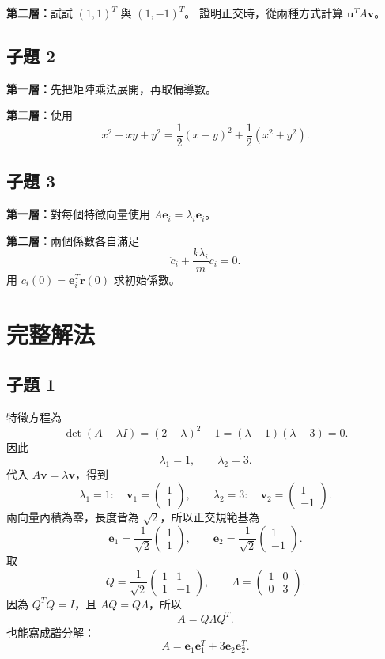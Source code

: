 \documentclass[12pt,a4paper]{article}
\begin{document}
\textbf{第二層：}試試 \((1,1)^T\) 與 \((1,-1)^T\)。
證明正交時，從兩種方式計算 \(\mathbf u^TA\mathbf v\)。

\subsection*{子題 2}
\textbf{第一層：}先把矩陣乘法展開，再取偏導數。

\textbf{第二層：}使用
\[
    x^2-xy+y^2=\frac12(x-y)^2+\frac12(x^2+y^2).
\]

\subsection*{子題 3}
\textbf{第一層：}對每個特徵向量使用 \(A\mathbf e_i=\lambda_i\mathbf e_i\)。

\textbf{第二層：}兩個係數各自滿足
\[
    \ddot c_i+\frac{k\lambda_i}{m}c_i=0.
\]
用 \(c_i(0)=\mathbf e_i^T\mathbf r(0)\) 求初始係數。

\clearpage
\section{完整解法}
\subsection*{子題 1}
特徵方程為
\[
    \det(A-\lambda I)
    =(2-\lambda)^2-1
    =(\lambda-1)(\lambda-3)=0.
\]
因此
\[
    \lambda_1=1,\qquad\lambda_2=3.
\]
代入 \(A\mathbf v=\lambda\mathbf v\)，得到
\[
    \lambda_1=1:\quad\mathbf v_1=\begin{pmatrix}1\\1\end{pmatrix},
    \qquad
    \lambda_2=3:\quad\mathbf v_2=\begin{pmatrix}1\\-1\end{pmatrix}.
\]
兩向量內積為零，長度皆為 \(\sqrt2\)，所以正交規範基為
\[
    \mathbf e_1=\frac1{\sqrt2}\begin{pmatrix}1\\1\end{pmatrix},
    \qquad
    \mathbf e_2=\frac1{\sqrt2}\begin{pmatrix}1\\-1\end{pmatrix}.
\]
取
\[
    Q=\frac1{\sqrt2}\begin{pmatrix}1&1\\1&-1\end{pmatrix},
    \qquad
    \Lambda=\begin{pmatrix}1&0\\0&3\end{pmatrix}.
\]
因為 \(Q^TQ=I\)，且 \(AQ=Q\Lambda\)，所以
\[
    \boxed{A=Q\Lambda Q^T}.
\]
也能寫成譜分解：
\[
    A=\mathbf e_1\mathbf e_1^T+3\mathbf e_2\mathbf e_2^T.
\]
\end{document}
